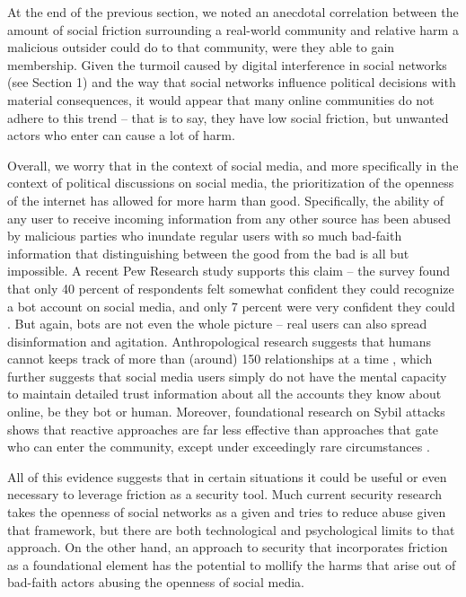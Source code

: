 \documentclass[sigconf,authordraft]{acmart}
\begin{document}
At the end of the previous section, we noted an anecdotal correlation between the amount of social friction surrounding a real-world community and relative harm a malicious outsider could do to that community, were they able to gain membership. Given the turmoil caused by digital interference in social networks (see Section 1) and the way that social networks influence political decisions with material consequences, it would appear that many online communities do not adhere to this trend -- that is to say, they have low social friction, but unwanted actors who enter can cause a lot of harm. 

Overall, we worry that in the context of social media, and more specifically in the context of political discussions on social media, the prioritization of the openness of the internet has allowed for more harm than good. Specifically, the ability of any user to receive incoming information from any other source has been abused by malicious parties who inundate regular users with so much bad-faith information that distinguishing between the good from the bad is all but impossible. A recent Pew Research study supports this claim -- the survey found that only 40 percent of respondents felt somewhat confident they could recognize a bot account on social media, and only 7 percent were very confident they could \cite{PewBotStudy}. But again, bots are not even the whole picture -- real users can also spread disinformation and agitation. Anthropological research suggests that humans cannot keeps track of more than (around) 150 relationships at a time \cite{zhou2005discrete}, which further suggests that social media users simply do not have the mental capacity to maintain detailed trust information about all the accounts they know about online, be they bot or human. Moreover, foundational research on Sybil attacks shows that reactive approaches are far less effective than approaches that gate who can enter the community, except under exceedingly rare circumstances \cite{douceur2002sybil}.

All of this evidence suggests that in certain situations it could be useful or even necessary to leverage friction as a security tool. Much current security research takes the openness of social networks as a given and tries to reduce abuse given that framework, but there are both technological \cite{douceur2002sybil} and psychological \cite{PewBotStudy,zhou2005discrete} limits to that approach. On the other hand, an approach to security that incorporates friction as a foundational element has the potential to mollify the harms that arise out of bad-faith actors abusing the openness of social media. 
\end{document}
